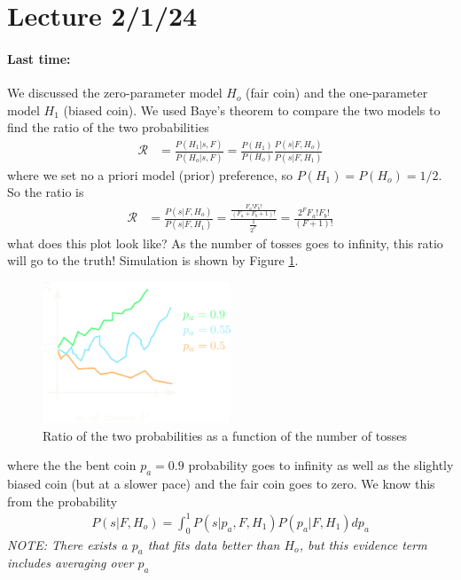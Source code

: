 \documentclass[../main.tex]{subfiles}
\begin{document}
\pagebreak 
\section*{Lecture 2/1/24}
\barh \vspace{10px}

\paragraph{Last time:} We discussed the zero-parameter model $H_o$ (fair coin) and the one-parameter
model $H_1$ (biased coin). We used Baye's theorem to compare the two models to find the ratio
of the two probabilities
\begin{align*}
    \mathcal{R} &= \frac{P(H_1 | s,F)}{P(H_o | s,F)} 
        = \frac{P(H_1)}{P(H_o)} \frac{P(s|F,H_o)}{P(s|F,H_1)}
\end{align*}
where we set no a priori model (prior) preference, so $P(H_1) = P(H_o) = 1/2$. So the ratio is
\begin{align*}
    \mathcal{R} &= \frac{P(s|F,H_o)}{P(s|F,H_1)}
        = \frac{\frac{F_a! F_b!}{(F_a + F_b + 1)!}}{\frac{1}{2^F}}
        = \frac{2^F F_a! F_b!}{(F + 1)!}
\end{align*}
what does this plot look like? As the number of tosses goes to infinity, this ratio will go to the
truth! Simulation is shown by Figure \ref{fig:bentcoin}.
\begin{figure}[ht]
    \centering
    \includegraphics[width=0.5\textwidth]{images/bentcoin.png}
    \caption{Ratio of the two probabilities as a function of the number of tosses}
    \label{fig:bentcoin}
\end{figure}
where the the bent coin $p_a = 0.9$ probability goes to infinity as well as the slightly biased coin
(but at a slower pace) and the fair coin goes to zero. We know this from the probability
\begin{align*}
    P(s|F,H_o) = \int_0^1 P(s|p_a, F, H_1) P(p_a|F, H_1) dp_a
\end{align*} 
\emph{NOTE: There exists a $p_a$ that fits data better than $H_o$, but this evidence term includes
averaging over $p_a$}
\end{document}
